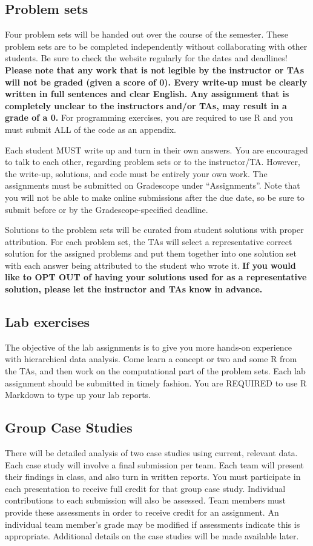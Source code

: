 \documentclass[11pt, a4paper]{article}
\begin{document}
\subsection{Problem sets}
Four problem sets will be handed out over the course of the semester. These problem sets are to be completed independently without collaborating with other students. Be sure to check the website regularly for the dates and deadlines! \textbf{Please note that any work that is not legible by the instructor or TAs will not be graded (given a score  of 0). Every write-up must be clearly written in full sentences and clear English. Any assignment that is completely unclear to the instructors and/or TAs, may result in a grade of a 0.} For programming exercises, you are required to use R and you must submit ALL of the code as an appendix.  

Each student MUST write up and turn in their own answers. You are encouraged to talk to each other, regarding problem sets or to the instructor/TA. However, the write-up, solutions, and code must be entirely your own work. The assignments must be submitted on Gradescope under ``Assignments''. Note that you will not be able to make online submissions after the due date, so be sure to submit before or by the Gradescope-specified deadline.

Solutions to the problem sets will be curated from student solutions with proper attribution. For each problem set, the TAs will select a representative correct solution for the assigned problems and put them together into one solution set with each answer being attributed to the student who wrote it. \textbf{If you would like to OPT OUT of having your solutions used for as a representative solution, please let the instructor and TAs know in advance.}

\subsection{Lab exercises}
The objective of the lab assignments is to give you more hands-on experience with hierarchical data analysis. Come learn a concept or two and some R from the TAs, and then work on the computational part of the problem sets. Each lab assignment should be submitted in timely fashion. You are REQUIRED to use R Markdown to type up your lab reports.

\subsection{Group Case Studies}
There will be detailed analysis of two case studies using current, relevant data. Each case study will involve a final submission per team.
Each team will present their findings in class, and also turn in written reports. You must participate in each presentation to receive full credit for that group case study. Individual contributions to each submission will also be assessed. Team members must provide these assessments in order to receive credit for an assignment. An individual team member’s grade may be modified if assessments indicate this is appropriate. Additional details on the case studies will be made available later.
\end{document}
